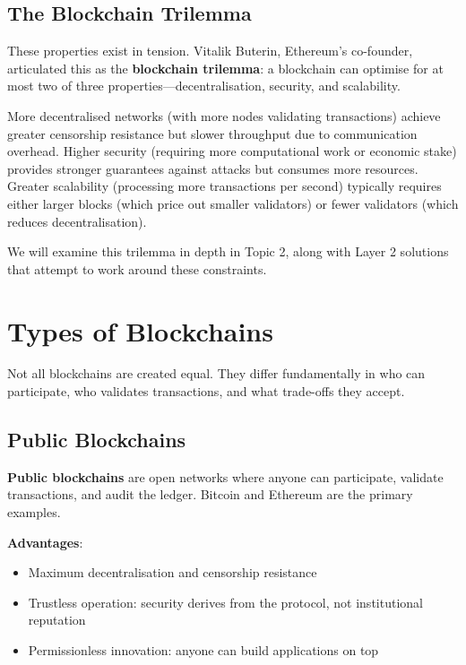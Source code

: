 \documentclass[11pt,a4paper]{article}
\newcommand{\keyword}[1]{\textbf{\textcolor{AccentOrange}{#1}}}
\begin{document}
\subsection{The Blockchain Trilemma}

These properties exist in tension. Vitalik Buterin, Ethereum's co-founder, articulated this as the \keyword{blockchain trilemma}: a blockchain can optimise for at most two of three properties---decentralisation, security, and scalability.

More decentralised networks (with more nodes validating transactions) achieve greater censorship resistance but slower throughput due to communication overhead. Higher security (requiring more computational work or economic stake) provides stronger guarantees against attacks but consumes more resources. Greater scalability (processing more transactions per second) typically requires either larger blocks (which price out smaller validators) or fewer validators (which reduces decentralisation).

We will examine this trilemma in depth in Topic 2, along with Layer 2 solutions that attempt to work around these constraints.

\section{Types of Blockchains}

Not all blockchains are created equal. They differ fundamentally in who can participate, who validates transactions, and what trade-offs they accept.

\subsection{Public Blockchains}

\keyword{Public blockchains} are open networks where anyone can participate, validate transactions, and audit the ledger. Bitcoin and Ethereum are the primary examples.

\textbf{Advantages}:
\begin{itemize}
    \item Maximum decentralisation and censorship resistance
    \item Trustless operation: security derives from the protocol, not institutional reputation
    \item Permissionless innovation: anyone can build applications on top
\end{itemize}
\end{document}
